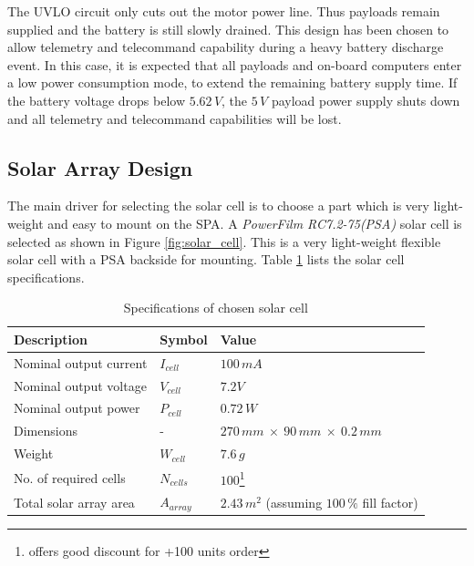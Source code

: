 The \ac{UVLO} circuit only cuts out the motor power line. Thus payloads remain supplied and the battery is still slowly drained. This design has been chosen to allow  telemetry and telecommand capability during a heavy battery discharge event. In this case, it is expected that all payloads and on-board computers enter a low power consumption mode, to extend the remaining battery supply time. If the battery voltage drops below $5.62\,V$, the $5\,V$ payload power supply shuts down and all telemetry and telecommand capabilities will be lost.
%
\subsection{Solar Array Design}
\label{sec:SA}
The main driver for selecting the solar cell is to choose a part which is very light-weight and easy to mount on the \ac{SPA}. A  \textit{PowerFilm RC7.2-75(PSA)} solar cell is selected as shown in Figure \ref{fig:solar_cell}. This is a very light-weight flexible solar cell with a \ac{PSA} backside for mounting. Table \ref{tab:solar_cell_spec} lists the solar cell specifications.
%
\begin{table}[H]
\centering
\caption{Specifications of chosen solar cell}
\label{tab:solar_cell_spec}
\begin{minipage}{\textwidth}
\begin{tabular}{p{}p{}p{}}
\hline
\textbf{Description} & \textbf{Symbol} & \textbf{Value}\\
\hline
Nominal output current & $I_{cell}$ & $100\,mA$\\
Nominal output voltage & $V_{cell}$ & $7.2V$\\
Nominal output power & $P_{cell}$ & $0.72\,W$\\
Dimensions & - & $270\,mm\:\times\:90\,mm\:\times\:0.2\,mm$\\
Weight & $W_{cell}$ & $7.6\,g$\\
No. of required cells & $N_{cells}$ & $100$\footnote{\cite{avnetexpress} offers good discount for +100 units order}\\
Total solar array area & $A_{array}$ & $2.43\,m^2$ (assuming $100\,\%$ fill factor)\\
\hline
\end{tabular}\par
\vspace{-0.75\skip\footins}
\renewcommand{\footnoterule}{}
\end{minipage}
\end{table}

